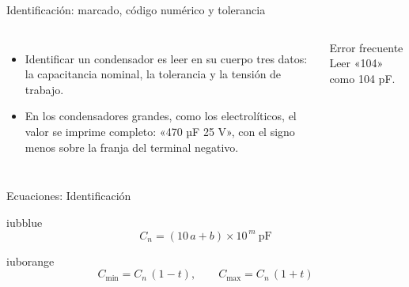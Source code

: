 \documentclass[aspectratio=169,11pt,xcolor={table}]{beamer}
\begin{document}
\begin{frame}{{\normalsize Identificación: marcado, código numérico y tolerancia}}
\begin{columns}[c,onlytextwidth]
\small
\begin{itemize}\setlength{\itemsep}{4pt}
  \item Identificar un condensador es leer en su cuerpo tres datos: la capacitancia nominal, la tolerancia y la tensión de trabajo.
  \item En los condensadores grandes, como los electrolíticos, el valor se imprime completo: «470 µF 25 V», con el signo menos sobre la franja del terminal negativo.
\end{itemize}
\begin{cardO}{Error frecuente}
\footnotesize Leer «104» como 104 pF.
\end{cardO}
\end{columns}
\end{frame}

\begin{frame}{Ecuaciones: Identificación}
\begin{cajaplana}{iubblue}
\centering
{\large
\begin{equation*}
  C_{n} = (10\,a + b) \times 10^{\,m}\ \text{pF}
\end{equation*}
}
\end{cajaplana}
\vspace{1mm}
\begin{cajaplana}{iuborange}
\centering
{\large
\begin{equation*}
  C_{\min} = C_{n}\,(1 - t), \qquad C_{\max} = C_{n}\,(1 + t)
\end{equation*}
}
\end{cajaplana}
\end{frame}
\end{document}
